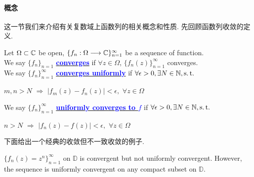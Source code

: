 \paragraph{概念}
这一节我们来介绍有关复数域上函数列的相关概念和性质. 先回顾函数列收敛的定义.
\begin{defn}\label{def 5.4.1}
	Let $\Omega \subset \mathbb{C}$ be open, $\{ f_n : \Omega \longrightarrow \mathbb{C} \}_{n = 1}^{\infty}$ be a sequence of function. \\
	We say $\{ f_n \}_{n = 1}$ \underline{\textcolor{blue}{\textbf{converges}}} if $\forall z \in \Omega$, $\{ f_{n}(z) \}_{n = 1}^{\infty}$ converges.\\
	We say $\{ f_n \}_{n = 1}^{\infty}$ \underline{\textcolor{blue}{\textbf{converges uniformly}}} if $\forall \epsilon > 0 , \exists N \in \mathbb{N} , \operatorname{s.t.}$
	\begin{center}
		$m , n > N \,\, \Rightarrow \,\, \left| f_{m}(z) - f_{n}(z) \right| < \epsilon , \,\, \forall z \in \Omega$
	\end{center}
	We say $\{ f_n \}_{n = 1}^{\infty}$ \underline{\textcolor{blue}{\textbf{uniformly converges to $f$}}} if $\forall \epsilon > 0 , \exists N \in \mathbb{N} , \operatorname{s.t.}$
	\begin{center}
		$n > N \,\, \Rightarrow \,\, \left| f_{n}(z) - f(z) \right| < \epsilon , \,\, \forall z \in \Omega$
	\end{center}
\end{defn}

\vspace{2em}
下面给出一个经典的收敛但不一致收敛的例子.
\begin{example}\label{ex 5.4.1}
	$\{ f_{n}(z) = z^n \}_{n = 1}^{\infty}$ on $\mathbb{D}$ is convergent but not uniformly convergent. However, the sequence is uniformly convergent on any compact subset on $\mathbb{D}$.
\end{example}

\vspace{2em}
